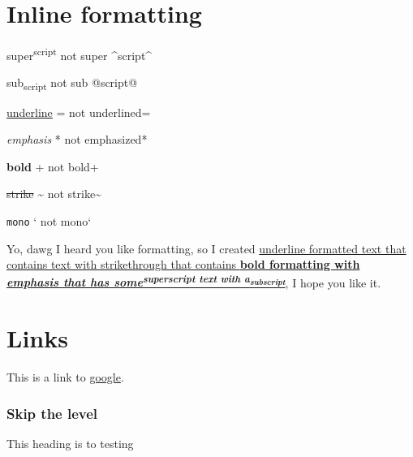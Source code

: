 \section{\label{inline-formatting}Inline formatting}
\par super\textsuperscript{script} not super {\textasciicircum}script{\textasciicircum}
\par sub\textsubscript{script} not sub @script@
\par \ul{underline}  = not underlined=
\par \emph{emphasis} * not emphasized*
\par \textbf{bold} + not bold+
\par \st{strike} {\textasciitilde} not strike{\textasciitilde}
\par \texttt{mono} ` not mono`
\par Yo, dawg I heard you like formatting, so I created \ul{underline formatted text that contains text with strikethrough that contains \textbf{bold formatting with \emph{emphasis that has some\textsuperscript{superscript text with a\textsubscript{subscript}}}}}, I hope you like it.
\section{\label{links}Links}
\par This is a link to \href{https://www.google.com}{google}.
\subsubsection{\label{skip-the-level}Skip the level}
\par This heading is to testing
